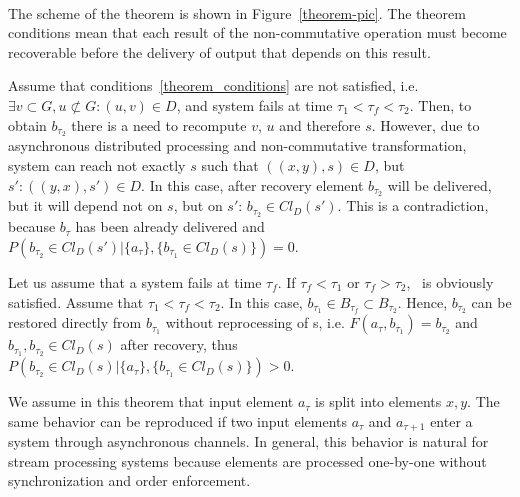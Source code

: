 \begin{sketch}
$ $\newline

The scheme of the theorem is shown in Figure~\ref{theorem-pic}. The theorem conditions mean that each result of the non-commutative operation must become recoverable before the delivery of output that depends on this result. 
$ $\newline

\newline

  Assume that conditions~\ref{theorem_conditions} are not satisfied, i.e. $\exists v \subset G, u \not\subset G: (u, v) \in D$, and system fails at time $\tau_1<\tau_f<\tau_2$. Then, to obtain $b_{\tau_2}$ there is a need to recompute $v$, $u$ and therefore $s$. However, due to asynchronous distributed processing and non-commutative transformation, system can reach not exactly $s$ such that $((x,y), s) \in D$, but $s':((y,x),s')\in D$. In this case, after recovery element $b_{\tau_2}$ will be delivered, but it will depend not on $s$, but on $s'$: $b_{\tau_2}\in Cl_D(s')$. This is a contradiction, because $b_\tau$ has been already delivered and $P(b_{\tau_2}\in Cl_D(s')|\{a_\tau\},\{b_{\tau_1} \in Cl_D(s) \})=0$.
$ $\newline

\newline

Let us assume that a  system fails at time $\tau_f$. If $\tau_f < \tau_1$ or $\tau_f > \tau_2$, \eo\ is obviously satisfied. Assume that $\tau_1<\tau_f<\tau_2$. In this case, $b_{\tau_1}\in B_{\tau_f}\subset B_{\tau_2}$. Hence, $b_{\tau_2}$ can be restored directly from $b_{\tau_1}$ without reprocessing of s, i.e. $F(a_\tau,b_{\tau_1})=b_{\tau_2}$ and $b_{\tau_1}, b_{\tau_2} \in Cl_D(s)$ after recovery, thus $P(b_{\tau_2}\in Cl_D(s)|\{a_\tau\},\{b_{\tau_1} \in Cl_D(s) \})>0$.
\end{sketch}


We assume   in this  theorem    that input element $a_\tau$ is split into elements $x,y$. The same behavior can be reproduced if two input elements $a_\tau$ and $a_{\tau+1}$ enter a system through asynchronous channels. In general, this behavior is natural for stream processing systems because elements are processed one-by-one without synchronization and order enforcement. 

